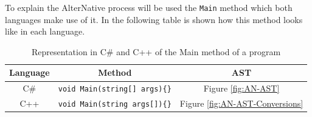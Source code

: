 To explain the AlterNative process will be used the \verb!Main! method which both languages make use of it. In the following table is shown how this method looks like in each language.
\begin{table}[htb]
\begin{center}
\begin{tabular}{|c|c|c|}
\hline
{\bf Language} & {\bf Method} & {\bf AST}  \\ \hline \hline
C\#        & \verb!void Main(string[] args){}!    & Figure \ref{fig:AN-AST}       \\ \hline
C++        & \verb!void Main(string args[]){}!    & Figure \ref{fig:AN-AST-Conversions}       \\ \hline
\end{tabular}
\caption{Representation in C\# and C++ of the Main method of a program}
\label{T:AN-Language-Main-Methods}
\end{center}
\end{table}

